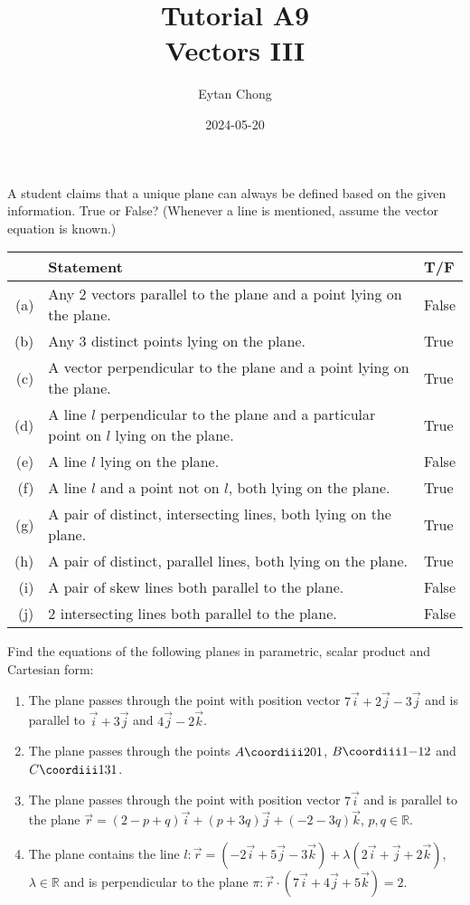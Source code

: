 \documentclass{jhwhw}
\title{Tutorial A9\\Vectors III}
\author{Eytan Chong}
\date{2024-05-20}
\begin{document}
    \problem{}
        A student claims that a unique plane can always be defined based on the given information. True or False? (Whenever a line is mentioned, assume the vector equation is known.)

        \begin{table}[h]
            \centering
            \begin{tabularx}{\textwidth}{r X l}
            & \textbf{Statement} & \textbf{T/F}\\\hline
            (a) & Any 2 vectors parallel to the plane and a point lying on the plane. & False \\
            (b) & Any 3 distinct points lying on the plane. & True \\
            (c) & A vector perpendicular to the plane and a point lying on the plane. & True\\
            (d) & A line $l$ perpendicular to the plane and a particular point on $l$ lying on the plane. & True\\
            (e) & A line $l$ lying on the plane. & False\\
            (f) & A line $l$ and a point not on $l$, both lying on the plane. & True\\
            (g) & A pair of distinct, intersecting lines, both lying on the plane. & True\\
            (h) & A pair of distinct, parallel lines, both lying on the plane. & True\\
            (i) & A pair of skew lines both parallel to the plane. & False\\
            (j) & 2 intersecting lines both parallel to the plane. & False
            \end{tabularx}
        \end{table}

    \problem{}
        Find the equations of the following planes in parametric, scalar product and Cartesian form:

        \begin{enumerate}
            \item The plane passes through the point with position vector $7\vec i + 2 \vec j -3\vec j$ and is parallel to $\vec i + 3\vec j$ and $4\vec j - 2\vec k$.
            \item The plane passes through the points $A\coordiii201$, $B\coordiii1{-1}2$ and $C\coordiii131$.
            \item The plane passes through the point with position vector $7\vec i$ and is parallel to the plane $\vec r = (2 - p + q)\vec i + (p + 3q)\vec j + (-2-3q)\vec k$, $p, q \in \mathbb{R}$.
            \item The plane contains the line $l : \vec r = (-2\vec i + 5\vec j -3\vec k) + \lambda(2\vec i + \vec j + 2\vec k)$, $\lambda \in \mathbb{R}$ and is perpendicular to the plane $\pi : \vec r \cdot (7\vec i + 4\vec j + 5\vec k) = 2$.
        \end{enumerate}
\end{document}
